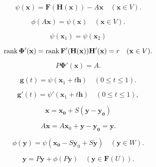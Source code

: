 \begin{equation}
    \label{eq:9.72}
    \psi(\mathbf{x}) = \mathbf{F(H(x))} - A\mathbf{x}
    \quad 
    (\mathbf{x} \in V).
\end{equation}

\begin{equation}
    \label{eq:9.73}
    \phi(A \mathbf{x}) = \psi(\mathbf{x})
    \quad 
    (\mathbf{x} \in V).
\end{equation}

\begin{equation}
    \label{eq:9.74}
    \psi(\mathbf{x}_1) = 
    \psi(\mathbf{x}_2)
\end{equation}


\begin{equation}
    \label{eq:9.75}
    \operatorname{\operatorname{rank}} \mathbf{\Phi'(x)} = 
    \operatorname{\operatorname{rank}} \mathbf{F'(H(x))H'(x)} = r
    \quad 
    (\mathbf{x} \in V).
\end{equation}


\begin{equation}
    \label{eq:9.76}
    P \mathbf{\Phi'(x)} = A.
\end{equation}


\begin{equation}
    \label{eq:9.77}
    \mathbf{g}(t) = \psi(\mathbf{x}_1 + t \mathbf{h})
    \quad 
    (0 \leq t \leq 1).
\end{equation}

\begin{equation}
    \label{eq:9.78}
    \mathbf{g}'(t) = \psi'(\mathbf{x}_1 + t \mathbf{h})
    \quad 
    (0 \leq t \leq 1),
\end{equation}


\begin{equation}
    \label{eq:9.79}
    \mathbf{x} = \mathbf{x_0} + S(\mathbf{y-y_0})
\end{equation}

\begin{equation*}
    A \mathbf{x} =
    A \mathbf{x}_0 + \mathbf{y-y_0} = \mathbf{y} .
\end{equation*}

\begin{equation}
    \label{eq:9.80}
    \phi(\mathbf{y}) = \psi(\mathbf{x_0} - S\mathbf{y}_0 + S\mathbf{y})
    \quad 
    (\mathbf{y} \in W).
\end{equation}



\begin{equation}
    \label{eq:9.81}
    \mathbf{y} = P \mathbf{y} + \phi(P \mathbf{y})
    \quad 
    (\mathbf{y} \in \mathbf{F}(U)).
\end{equation}
